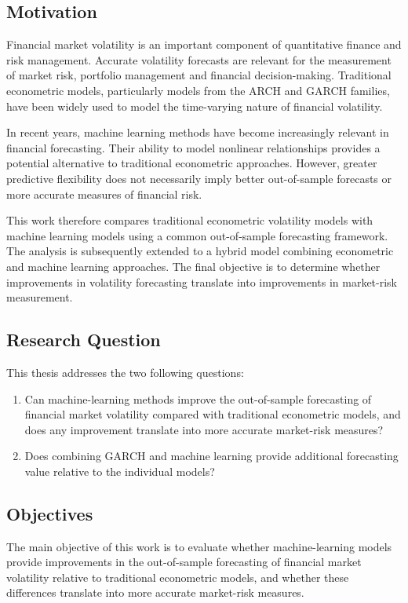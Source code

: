 \documentclass[12pt,a4paper]{article}
\begin{document}
\subsection{Motivation}
Financial market volatility is an important component of quantitative finance and risk management.
Accurate volatility forecasts are relevant for the measurement of market risk, portfolio management
and financial decision-making. Traditional econometric models, particularly models from the ARCH
and GARCH families, have been widely used to model the time-varying nature of financial volatility.

In recent years, machine learning methods have become increasingly relevant in financial forecasting.
Their ability to model nonlinear relationships provides a potential alternative to traditional
econometric approaches. However, greater predictive flexibility does not necessarily imply better
out-of-sample forecasts or more accurate measures of financial risk.

This work therefore compares traditional econometric volatility models with machine learning models
using a common out-of-sample forecasting framework. The analysis is subsequently extended to a
hybrid model combining econometric and machine learning approaches. The final objective is to
determine whether improvements in volatility forecasting translate into improvements in market-risk
measurement.
\subsection{Research Question}
This thesis addresses the two following questions:

\begin{enumerate}
    \item Can machine-learning methods improve the out-of-sample forecasting of financial market volatility compared with traditional econometric models, and does any improvement translate into more accurate market-risk measures?
    \item Does combining GARCH and machine learning provide additional forecasting value relative to the individual models?
\end{enumerate}
\subsection{Objectives}
The main objective of this work is to evaluate whether machine-learning models provide improvements
in the out-of-sample forecasting of financial market volatility relative to traditional econometric
models, and whether these differences translate into more accurate market-risk measures.
\end{document}

